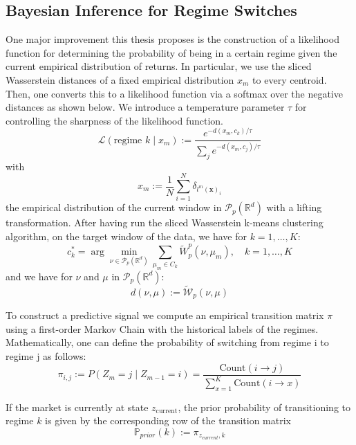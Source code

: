 \documentclass[12pt,a4paper]{report}
\begin{document}
\subsection{Bayesian Inference for Regime Switches}
One major improvement this thesis proposes is the construction of a likelihood function for determining the probability of being in a certain regime given the current empirical distribution of returns.
In particular, we use the sliced Wasserstein distances of a fixed empirical distribution $x_m$ to every centroid. Then, one converts this to a likelihood function via a softmax over the negative distances as shown below.
We introduce a temperature parameter $\tau$ for controlling the sharpness of the likelihood function.
\begin{equation}
  \mathcal{L}(\text{regime } k \mid x_m) := \frac{e^{-d(x_m, c_k) / \tau}}{\sum_{j} e^{-d(x_m, c_j) / \tau}} \label{eq:softmax_likelihood}
\end{equation}
with 
$$ x_m := \frac{1}{N} \sum_{i=1}^{N} \delta_{l^m(\mathbf{x})_i}$$
the empirical distribution of the current window in $\mathcal{P}_p(\mathbb{R}^d)$ with a lifting transformation. After having run the sliced Wasserstein k-means clustering algorithm, on the target window of the data, we have for $k = 1, \dots, K$: 
\begin{equation}
    c_k^* = \arg\min_{\nu \in \mathcal{P}_p(\mathbb{R}^d)} 
    \sum_{\mu_m \in C_k} \widetilde{W}_p^p(\nu, \mu_m), 
    \quad k = 1, \ldots, K
\end{equation}
and we have for $\nu$ and $\mu$ in $\mathcal{P}_p(\mathbb{R}^d)$:
$$
d(\nu, \mu) := \widetilde{\mathcal{W}}_p(\nu, \mu)
$$

To construct a predictive signal we compute an empirical transition matrix $\pi$ using a first-order Markov Chain with the historical labels of the regimes.
Mathematically, one can define the probability of switching from regime i to regime j as follows: 
\begin{equation}
\pi_{i,j} := P(Z_m = j \mid Z_{m-1} = i) = \frac{\text{Count}(i \to j)}{\sum_{x=1}^{K} \text{Count}(i \to x)}
\end{equation}

If the market is currently at state $z_{\text{current}}$, the prior probability of transitioning to regime $k$
is given by the corresponding row of the transition matrix
\begin{equation}
  \mathbb{P}_{prior}(k) := \pi_{z_{current},k}  
\end{equation}
\end{document}
